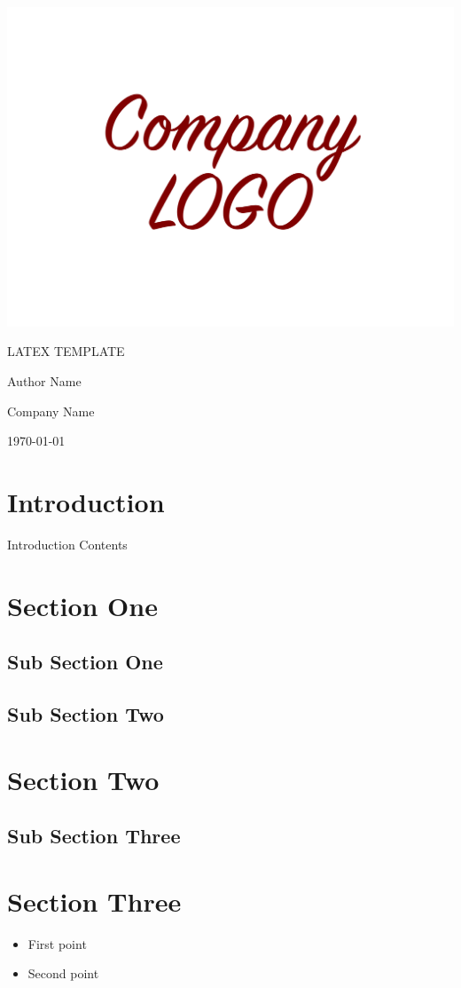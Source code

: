 \documentclass[12pt]{article}
\newcommand{\docTitle}{LaTeX Template}
\newcommand{\docCompany}{Company Name}
\begin{document}
\thispagestyle{empty}
\begin{center}
    \centering
    \includegraphics[width=0.5\linewidth]{Logo.pdf}

    \vspace{1cm}
    {\uppercase{\Large \docTitle}}

    \vspace{3cm}
    \vspace{3cm}
    {\Large Author Name}
    
    \vspace{0.5cm}
    {\docCompany}

    \vspace{2cm}
    {\today}
\end{center}
\clearpage

\section{Introduction}
Introduction Contents

\section{Section One}\label{Section One}
\subsection{Sub Section One}\label{Sub Section One}
\subsection{Sub Section Two}\label{Sub Section Two}
\section{Section Two}\label{Section Two}
\subsection{Sub Section Three}\label{Sub Section Three}
\section{Section Three}\label{Section Three}
\begin{itemize}
  \item First point
  \item Second point
\end{itemize}
\end{document}
